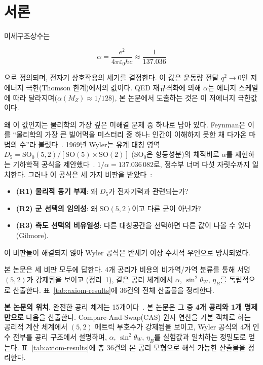 \documentclass[entropy,article,submit,pdftex,oneauthor]{Definitions/mdpi}
\begin{document}
\section{서론}
\label{sec:intro}

미세구조상수는
\begin{linenomath}
\begin{equation}
\alpha = \frac{e^2}{4\pi\varepsilon_0 \hbar c} \approx \frac{1}{137.036}
\label{eq:alpha-def}
\end{equation}
\end{linenomath}
으로 정의되며, 전자기 상호작용의 세기를 결정한다. 이 값은 운동량 전달 $q^2 \to 0$인 저에너지 극한(Thomson 한계)에서의 값이다. QED 재규격화에 의해 $\alpha$는 에너지 스케일에 따라 달라지며($\alpha(M_Z) \approx 1/128$), 본 논문에서 도출하는 것은 이 저에너지 극한값이다.

왜 이 값인지는 물리학의 가장 깊은 미해결 문제 중 하나로 남아 있다. Feynman은 이를 ``물리학의 가장 큰 빌어먹을 미스터리 중 하나: 인간이 이해하지 못한 채 다가온 마법의 수''라 불렀다~\cite{feynman1985}.
1969년 Wyler는 유계 대칭 영역 $D_5 = \mathrm{SO}_0(5,2)/[\mathrm{SO}(5)\times\mathrm{SO}(2)]$ ($\mathrm{SO}_0$은 항등성분)의 체적비로 $\alpha$를 재현하는 기하학적 공식을 제안했다~\cite{wyler1969,wyler1971}. $1/\alpha = 137.036\,082$로, 정수부 너머 다섯 자릿수까지 일치한다. 그러나 이 공식은 세 가지 비판을 받았다~\cite{robertson1971,gilmore1972}:

\begin{itemize}
\item \textbf{(R1) 물리적 동기 부재}: 왜 $D_5$가 전자기력과 관련되는가?
\item \textbf{(R2) 군 선택의 임의성}: 왜 $\mathrm{SO}(5,2)$이고 다른 군이 아닌가?
\item \textbf{(R3) 측도 선택의 비유일성}: 다른 대칭공간을 선택하면 다른 값이 나올 수 있다(Gilmore).
\end{itemize}

이 비판들이 해결되지 않아 Wyler 공식은 반세기 이상 수치적 우연으로 방치되었다.

본 논문은 세 비판 모두에 답한다. 4개 공리가 비용의 비가역/가역 분류를 통해 서명 $(5,2)$가 강제됨을 보이고 (정리~1), 같은 공리 체계에서 $\alpha$, $\sin^2\theta_W$, $\eta_B$를 독립적으로 산출한다. 표~\ref{tab:axiom-results}에 36건의 전체 산출물을 정리한다.


\textbf{본 논문의 위치}. 완전한 공리 체계는 15개이다~\cite{han2026}. 본 논문은 그 중 \textbf{4개 공리와 1개 명제만으로} 다음을 산출한다. Compare-And-Swap(CAS) 원자 연산을 기본 객체로 하는 공리적 계산 체계에서 $(5,2)$ 메트릭 부호수가 강제됨을 보이고, Wyler 공식의 4개 인수 전부를 공리 구조에서 설명하며, $\alpha$, $\sin^2\theta_W$, $\eta_B$를 실험값과 일치하는 정밀도로 얻는다. 표~\ref{tab:axiom-results}에 총 36건의 본 공리 모형으로 해석 가능한 산출물을 정리한다.
\end{document}
